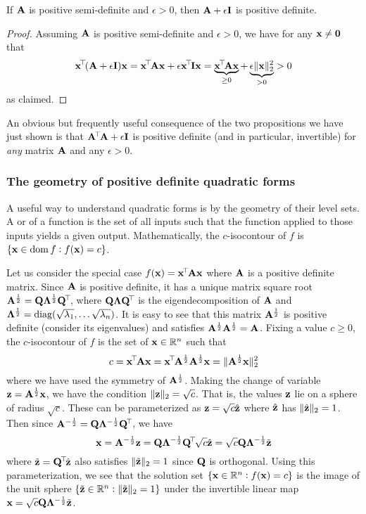 \begin{proposition}
If $\mathbf{A}$ is positive semi-definite and $\epsilon > 0$, then $\mathbf{A} + \epsilon\mathbf{I}$ is positive definite.
\end{proposition}
\begin{proof}
Assuming $\mathbf{A}$ is positive semi-definite and $\epsilon > 0$, we have for any $\mathbf{x} \neq \mathbf{0}$ that
\[\x\tran(\A+\epsilon\I)\x = \x\tran\A\x + \epsilon\x\tran\I\x = \underbrace{\x\tran\A\x}_{\geq 0} + \underbrace{\epsilon\|\x\|_2^2}_{> 0} > 0\]
as claimed.
\end{proof}
An obvious but frequently useful consequence of the two propositions we have just shown is that $\mathbf{A}^{\!\top\!}\mathbf{A} + \epsilon\mathbf{I}$ is positive definite (and in particular, invertible) for \textit{any} matrix $\mathbf{A}$ and any $\epsilon > 0$.

\subsubsection{The geometry of positive definite quadratic forms}
A useful way to understand quadratic forms is by the geometry of their level sets.
A  or  of a function is the set of all inputs such that the function applied to those inputs yields a given output.
Mathematically, the $c$-isocontour of $f$ is $\{\mathbf{x} \in \operatorname*{dom} f : f(\mathbf{x}) = c\}$.

Let us consider the special case $f(\mathbf{x}) = \mathbf{x}^{\!\top\!}\mathbf{A}\mathbf{x}$ where $\mathbf{A}$ is a positive definite matrix.
Since $\mathbf{A}$ is positive definite, it has a unique matrix square root $\mathbf{A}^{\frac{1}{2}} = \mathbf{Q}\mathbf{\Lambda}^{\frac{1}{2}}\mathbf{Q}^{\!\top\!}$, where $\mathbf{Q}\mathbf{\Lambda}\mathbf{Q}^{\!\top\!}$ is the eigendecomposition of $\mathbf{A}$ and $\mathbf{\Lambda}^{\frac{1}{2}} = \operatorname*{diag}(\sqrt{\lambda_1}, \dots \sqrt{\lambda_n})$.
It is easy to see that this matrix $\mathbf{A}^{\frac{1}{2}}$ is positive definite (consider its eigenvalues) and satisfies $\mathbf{A}^{\frac{1}{2}}\mathbf{A}^{\frac{1}{2}} = \mathbf{A}$.
Fixing a value $c \geq 0$, the $c$-isocontour of $f$ is the set of $\mathbf{x} \in \mathbb{R}^n$ such that
\[c = \mathbf{x}^{\!\top\!}\mathbf{A}\mathbf{x} = \mathbf{x}^{\!\top\!}\mathbf{A}^{\frac{1}{2}}\mathbf{A}^{\frac{1}{2}}\mathbf{x} = \|\mathbf{A}^{\frac{1}{2}}\mathbf{x}\|_2^2\]
where we have used the symmetry of $\mathbf{A}^{\frac{1}{2}}$.
Making the change of variable $\mathbf{z} = \mathbf{A}^{\frac{1}{2}}\mathbf{x}$, we have the condition $\|\mathbf{z}\|_2 = \sqrt{c}$.
That is, the values $\mathbf{z}$ lie on a sphere of radius $\sqrt{c}$.
These can be parameterized as $\mathbf{z} = \sqrt{c}\hat{\mathbf{z}}$ where $\hat{\mathbf{z}}$ has $\|\hat{\mathbf{z}}\|_2 = 1$.
Then since $\mathbf{A}^{-\frac{1}{2}} = \mathbf{Q}\mathbf{\Lambda}^{-\frac{1}{2}}\mathbf{Q}^{\!\top\!}$, we have
\[\mathbf{x} = \mathbf{A}^{-\frac{1}{2}}\mathbf{z} = \mathbf{Q}\mathbf{\Lambda}^{-\frac{1}{2}}\mathbf{Q}^{\!\top\!}\sqrt{c}\hat{\mathbf{z}} = \sqrt{c}\mathbf{Q}\mathbf{\Lambda}^{-\frac{1}{2}}\tilde{\mathbf{z}}\]
where $\tilde{\mathbf{z}} = \mathbf{Q}^{\!\top\!}\hat{\mathbf{z}}$ also satisfies $\|\tilde{\mathbf{z}}\|_2 = 1$ since $\mathbf{Q}$ is orthogonal.
Using this parameterization, we see that the solution set $\{\mathbf{x} \in \mathbb{R}^n : f(\mathbf{x}) = c\}$ is the image of the unit sphere $\{\tilde{\mathbf{z}} \in \mathbb{R}^n : \|\tilde{\mathbf{z}}\|_2 = 1\}$ under the invertible linear map $\mathbf{x} = \sqrt{c}\mathbf{Q}\mathbf{\Lambda}^{-\frac{1}{2}}\tilde{\mathbf{z}}$.

